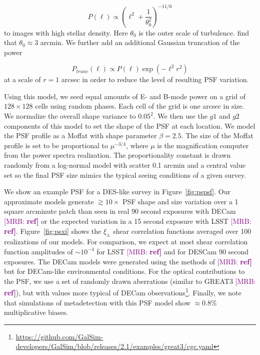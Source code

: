 \documentclass[fleqn,useAMS,usenatbib]{mnras}
\newcommand{\mrb}[1]{\textcolor{purple}{[MRB: \bf #1]}}
\begin{document}
\begin{displaymath}
  P(\ell) \propto \left(\ell^{2} + \frac{1}{\theta_{0}^2}\right)^{-11/6}
\end{displaymath}
to images with high stellar density. Here $\theta_{0}$ is the outer scale of
turbulence. \citep{heymans2012} find that $\theta_{0}\approx3$ arcmin.
We further add an additional Gaussian truncation of the power

\begin{displaymath}
  P_{trunc}(\ell) \propto P(\ell)\exp\left(-\ell^2r^{2}\right)
\end{displaymath}
at a scale of $r=1$ arcsec in order to reduce the level of resulting
PSF variation.

Using this model, we seed equal amounts of E- and B-mode power on a grid of
$128\times128$ cells using random phases. Each cell of the grid is one
arcsec in size. We normalize the overall shape variance to $0.05^2$. We then use
the $g1$ and $g2$ components of this model to set the shape of the PSF at each
location. We model the PSF profile as a Moffat with shape parameter $\beta=2.5$.
The size of the Moffat profile is set to be proportional to $\mu^{-3/4}$,
where $\mu$ is the magnification computer from the power spectra realization. The
proportionality constant is drawn randomly from a log-normal model with
scatter 0.1 arcmin and a central value set so the final PSF size mimics
the typical seeing conditions of a given survey.

We show an example PSF for a DES-like survey in Figure~\ref{fig:pspsf}. Our
approximate models generate $\gtrsim10\times$ PSF shape and size variation over
a 1 square arcminute patch than seen in real 90 second exposures with DECam
\mrb{ref} or the expected variation in a 15 second exposure with LSST \mrb{ref}.
Figure~\ref{fig:psxi} shows the $\xi_{\pm}$ shear correlation functions averaged
over 100 realizations of our models. For comparison, we expect at most shear
correlation function amplitudes of $\sim10^{-4}$ for LSST \mrb{ref} and
for DESCam 90 second exposures. The DECam models were
generated using the methods of \mrb{ref} but for DECam-like environmental
conditions. For the optical contributions to the PSF, we use a set of randomly
drawn aberrations (similar to GREAT3 \mrb{ref}), but with values more typical
of DECam observations\footnote{\url{https://github.com/GalSim-developers/GalSim/blob/releases/2.1/examples/great3/cgc.yaml}}.
Finally, we note that simulations of metadetection with this PSF model
show $\approx0.8\%$ multiplicative biases.
\end{document}
